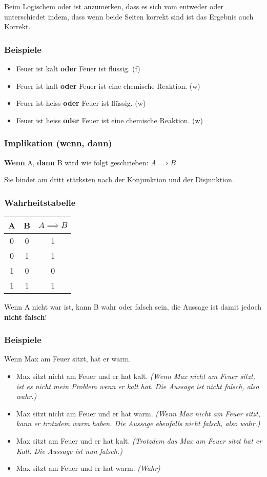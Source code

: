 \documentclass[a4paper,12pt]{article}
\begin{document}
Beim Logischem oder ist anzumerken, dass es sich vom entweder oder unterschiedet indem, dass wenn beide Seiten korrekt sind ist das Ergebnis auch Korrekt.

\subsubsection*{Beispiele}

\begin{itemize}
  \item Feuer ist kalt \textbf{oder} Feuer ist flüssig. (f)
  \item Feuer ist kalt \textbf{oder} Feuer ist eine chemische Reaktion. (w)
  \item Feuer ist heiss \textbf{oder} Feuer ist flüssig. (w)
  \item Feuer ist heiss \textbf{oder} Feuer ist eine chemische Reaktion. (w)
\end{itemize}

\subsubsection{Implikation (wenn, dann)}

\textbf{Wenn} A, \textbf{dann} B wird wie folgt geschrieben: \( A \implies B \)

Sie bindet am dritt stärksten nach der Konjunktion und der Disjunktion.
\subsubsection*{Wahrheitstabelle}
\begin{tabular}{c|c || c}
  A & B & \( A \implies B \) \\
  \hline
  0 & 0 & 1 \\
  0 & 1 & 1\\
  1 & 0 & 0\\
  1 & 1 & 1\\
\end{tabular}\break

Wenn A nicht war ist, kann B wahr oder falsch sein, die Aussage ist damit jedoch \textbf{nicht falsch}!

\pagebreak

\subsubsection*{Beispiele}
Wenn Max am Feuer sitzt, hat er warm.
\begin{itemize}
  \item Max sitzt nicht am Feuer und er hat kalt. 
  \textit{(Wenn Max nicht am Feuer sitzt, ist es nicht mein Problem wenn er kalt hat. Die Aussage ist nicht falsch, also wahr.)}
  \item Max sitzt nicht am Feuer und er hat warm. 
  \textit{(Wenn Max nicht am Feuer sitzt, kann er trotzdem warm haben. Die Aussage ebenfalls nicht falsch, also wahr.)
}  \item Max sitzt am Feuer und er hat kalt. 
  \textit{(Trotzdem das Max am Feuer sitzt hat er Kalt. Die Aussage ist nun falsch.)}
  \item Max sitzt am Feuer und er hat warm. \textit{(Wahr)}
\end{itemize}
\end{document}

